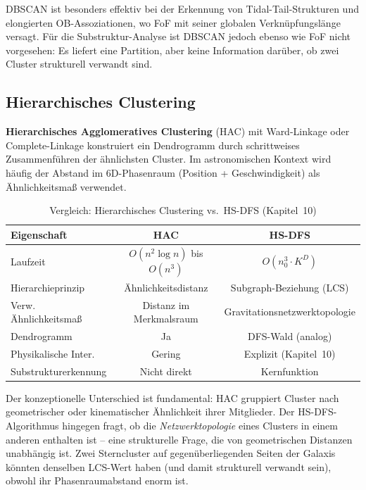 ﻿\documentclass[a4paper,12pt]{report}
\theoremstyle{definition}
\begin{document}
DBSCAN ist besonders effektiv bei der Erkennung von Tidal-Tail-Strukturen und elongierten OB-Assoziationen, wo FoF mit seiner globalen Verknüpfungslänge versagt. Für die Substruktur-Analyse ist DBSCAN jedoch ebenso wie FoF nicht vorgesehen: Es liefert eine Partition, aber keine Information darüber, ob zwei Cluster strukturell verwandt sind.

\subsection{Hierarchisches Clustering}
\label{ssec:hierarchisch}

\textbf{Hierarchisches Agglomeratives Clustering} (HAC) mit Ward-Linkage oder Complete-Linkage konstruiert ein Dendrogramm durch schrittweises Zusammenführen der ähnlichsten Cluster. Im astronomischen Kontext wird häufig der Abstand im 6D-Phasenraum (Position + Geschwindigkeit) als Ähnlichkeitsmaß verwendet.

\begin{table}[H]
\centering
\caption{Vergleich: Hierarchisches Clustering vs.\ HS-DFS (Kapitel~10)}
\label{tab:hac}
\begin{tabular}{lcc}
\toprule
Eigenschaft & HAC & HS-DFS \\
\midrule
Laufzeit & $O(n^2 \log n)$ bis $O(n^3)$ & $O(n_0^3 \cdot K^D)$ \\
Hierarchieprinzip & Ähnlichkeitsdistanz & Subgraph-Beziehung (LCS) \\
Verw. Ähnlichkeitsmaß & Distanz im Merkmalsraum & Gravitationsnetzwerktopologie \\
Dendrogramm & Ja & DFS-Wald (analog) \\
Physikalische Inter. & Gering & Explizit (Kapitel~10) \\
Substrukturerkennung & Nicht direkt & Kernfunktion \\
\bottomrule
\end{tabular}
\end{table}

Der konzeptionelle Unterschied ist fundamental: HAC gruppiert Cluster nach geometrischer oder kinematischer Ähnlichkeit ihrer Mitglieder. Der HS-DFS-Algorithmus hingegen fragt, ob die \emph{Netzwerktopologie} eines Clusters in einem anderen enthalten ist -- eine strukturelle Frage, die von geometrischen Distanzen unabhängig ist. Zwei Sterncluster auf gegenüberliegenden Seiten der Galaxis könnten denselben LCS-Wert haben (und damit strukturell verwandt sein), obwohl ihr Phasenraumabstand enorm ist.
\end{document}
